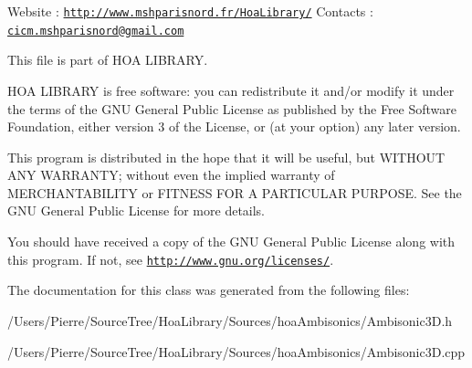 Website \-: \href{http://www.mshparisnord.fr/HoaLibrary/}{\tt http\-://www.\-mshparisnord.\-fr/\-Hoa\-Library/} Contacts \-: \href{mailto:cicm.mshparisnord@gmail.com}{\tt cicm.\-mshparisnord@gmail.\-com}

This file is part of H\-O\-A L\-I\-B\-R\-A\-R\-Y.

H\-O\-A L\-I\-B\-R\-A\-R\-Y is free software\-: you can redistribute it and/or modify it under the terms of the G\-N\-U General Public License as published by the Free Software Foundation, either version 3 of the License, or (at your option) any later version.

This program is distributed in the hope that it will be useful, but W\-I\-T\-H\-O\-U\-T A\-N\-Y W\-A\-R\-R\-A\-N\-T\-Y; without even the implied warranty of M\-E\-R\-C\-H\-A\-N\-T\-A\-B\-I\-L\-I\-T\-Y or F\-I\-T\-N\-E\-S\-S F\-O\-R A P\-A\-R\-T\-I\-C\-U\-L\-A\-R P\-U\-R\-P\-O\-S\-E. See the G\-N\-U General Public License for more details.

You should have received a copy of the G\-N\-U General Public License along with this program. If not, see \href{http://www.gnu.org/licenses/}{\tt http\-://www.\-gnu.\-org/licenses/}. 

The documentation for this class was generated from the following files\-:\begin{DoxyCompactItemize}
\item 
/\-Users/\-Pierre/\-Source\-Tree/\-Hoa\-Library/\-Sources/hoa\-Ambisonics/Ambisonic3\-D.\-h\item 
/\-Users/\-Pierre/\-Source\-Tree/\-Hoa\-Library/\-Sources/hoa\-Ambisonics/Ambisonic3\-D.\-cpp\end{DoxyCompactItemize}
